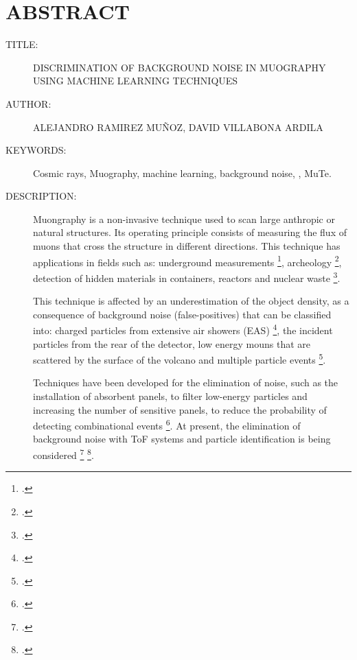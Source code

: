 \chapter*{ABSTRACT}

\footnotesize{
\begin{description}
  \item[TITLE:] DISCRIMINATION OF BACKGROUND NOISE IN MUOGRAPHY USING MACHINE LEARNING TECHNIQUES 
  \item[AUTHOR:] ALEJANDRO RAMIREZ MUÑOZ, DAVID VILLABONA ARDILA 
  \item[KEYWORDS:] Cosmic rays,  Muography, machine learning, background noise, , MuTe.
  \item[DESCRIPTION:]\hfill 
  
Muongraphy is a non-invasive technique used to scan large anthropic or natural structures. Its operating principle consists of measuring the flux of muons that cross the structure in different directions. This technique has applications in fields such as: underground measurements \footcite {Tanaka2005, Tanaka2009, Lesparre2010, Lesparre2011, Lesparre2012}, archeology \footcite {Morishima2017, Gmez2016, Alvarez1970}, detection of hidden materials in containers, reactors and nuclear waste \footcite { Fujii2013}. 

This technique is affected by an underestimation of the object density, as a consequence of background noise (false-positives) that can be classified into: charged particles from extensive air showers (EAS) \footcite {Nishiyama2014, Gomez2017}, the incident particles from the rear of the detector, low energy mouns that are scattered by the surface of the volcano and multiple particle events \footcite {nishiyama2014experimental}. 

Techniques have been developed for the elimination of noise, such as the installation of absorbent panels, to filter low-energy particles and increasing the number of sensitive panels, to reduce the probability of detecting combinational events  \footcite {Lesparre2012}. At present, the elimination of background noise with ToF systems and particle identification  is being considered \footcite {mounes that impact the detector from the rear.} \Footcite {Marteau2014, Cimmino2017}.




\end{description}}\normalsize
